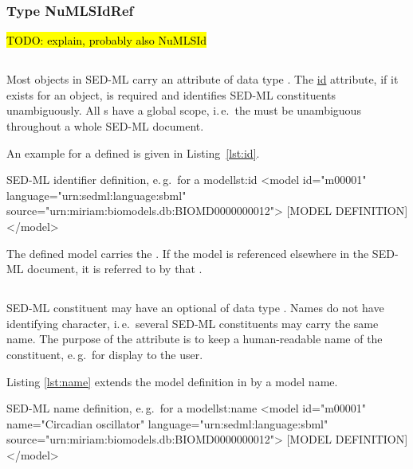 \subsubsection{Type NuMLSIdRef}
\label{type:numlsidref}
\hl{TODO: explain, probably also NuMLSId}


\subsection{}
\label{sec:id}
Most objects in SED-ML carry an  attribute of data type . The \hyperref[sec:id]{id} attribute, if it exists for an object, is required and identifies SED-ML constituents unambiguously. All s have a global scope, i.\,e.\ the  must be unambiguous throughout a whole SED-ML document.

An example for a defined  is given in Listing~\ref{lst:id}.

\begin{myXmlLst}{SED-ML identifier definition, e.\,g.\ for a model}{lst:id}
<model id="m00001" language="urn:sedml:language:sbml" source="urn:miriam:biomodels.db:BIOMD0000000012">
	[MODEL DEFINITION]
</model>
\end{myXmlLst}

The defined model carries the   . If the model is referenced elsewhere in the SED-ML document, it is referred to by that .


\subsection{}
\label{sec:name}
SED-ML constituent may have an optional  of data type . Names do not have identifying character, i.\,e.\ several SED-ML constituents may carry the same name. The purpose of the  attribute is to keep a human-readable name of the constituent, e.\,g.\ for display to the user.

Listing \ref{lst:name} extends the model definition in  by a model name.

\begin{myXmlLst}{SED-ML name definition, e.\,g.\ for a model}{lst:name}
<model id="m00001" name="Circadian oscillator" language="urn:sedml:language:sbml" source="urn:miriam:biomodels.db:BIOMD0000000012">
	[MODEL DEFINITION]
</model>
\end{myXmlLst}


